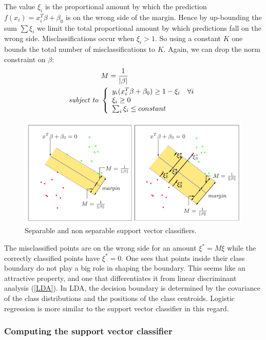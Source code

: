 The value $\xi_i$ is the proportional amount by which the prediction $f(x_i) = x_i^T\beta+\beta_0$ is on the wrong side of the margin. Hence by up-bounding the sum $\sum \xi_i$ we limit the total proportional amount by which predictions fall on the wrong side. Misclassifications occur when $\xi_i> 1$. So using  a constant $K$ one bounds the total number of misclassifications to $K$. Again, we can drop the norm constraint on $\beta$:
\begin{equation}
\begin{aligned}
&M = \frac{1}{\left| \beta\right|}\\
\textit{subject to } &\left\{
		\begin{array}{ll}
				y_i(x_i^T\beta +\mathbf{\beta}_0) \ge 1-\xi_i \quad \forall i \\ 
 				\xi_i \ge 0\\
 				\sum_i \xi_i \le constant
		\end{array} 
\right.
\end{aligned}
\label{SVMOpt}
\end{equation}
\begin{figure}
\centering
\includegraphics[scale=0.5]{img/SVM}
\caption{Separable and non separable support vector classifiers.}
\end{figure}
The misclassified points are on the wrong side for an amount $\xi^* = M \xi$ while the correctly classified points have $\xi^*=0$. One sees that points inside their class boundary do not play a big role in shaping the boundary. This seems like an attractive property, and one that differentiates it from linear discriminant analysis (\autoref{LDA}). In LDA, the decision boundary is determined by the covariance of the class distributions and the positions of the class centroids. Logistic regression is more similar to the support vector classifier in this regard.

\subsubsection{Computing the support vector classifier}

